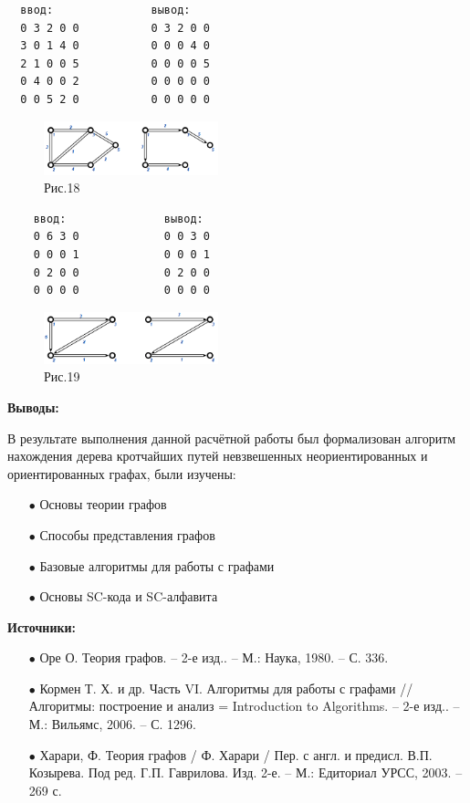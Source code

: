\documentclass[10pt,a4paper,twocolumn]{article}
\begin{document}
\begin{verbatim}
  ввод:               вывод:
  0 3 2 0 0           0 3 2 0 0
  3 0 1 4 0           0 0 0 4 0
  2 1 0 0 5           0 0 0 0 5
  0 4 0 0 2           0 0 0 0 0
  0 0 5 2 0           0 0 0 0 0
\end{verbatim}
\begin{figure}[h]
	\includegraphics[width=0.45\textwidth]{img/img18.png}
    \caption{Рис.18}
\end{figure}

\begin{verbatim}
    ввод:               вывод:
    0 6 3 0             0 0 3 0
    0 0 0 1             0 0 0 1
    0 2 0 0             0 2 0 0
    0 0 0 0             0 0 0 0
\end{verbatim}
\begin{figure}[h]
	\includegraphics[width=0.45\textwidth]{img/img19.png}
    \caption{Рис.19}
\end{figure}

\newpage
\large{\textbf{Выводы:}}
\par В результате выполнения данной расчётной работы был формализован алгоритм нахождения дерева кротчайших путей невзвешенных неориентированных  и ориентированных графах, были изучены:
\begin{enumerate}
	\item[$\bullet$] Основы теории графов
	\item[$\bullet$] Способы представления графов
	\item[$\bullet$] Базовые алгоритмы для работы с графами
	\item[$\bullet$] Основы SC-кода и SC-алфавита
\end{enumerate}
\large{\textbf{Источники:}}
\begin{enumerate}
	\item[$\bullet$] Оре О. Теория графов. – 2-е изд.. – М.: Наука, 1980. – С. 336.
	\item[$\bullet$] Кормен Т. Х. и др. Часть VI. Алгоритмы для работы с графами // Алгоритмы: построение и анализ = Introduction to Algorithms. – 2-е изд.. – М.: Вильямс, 2006. – С. 1296.
	\item[$\bullet$] Харари, Ф. Теория графов / Ф. Харари / Пер. с англ. и предисл. В.П. Козырева. Под ред. Г.П. Гаврилова. Изд. 2-е. – М.: Едиториал УРСС, 2003. – 269 с.
\end{enumerate}
\end{document}
